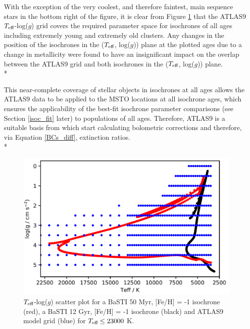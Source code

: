 \documentclass[12pt, a4paper]{report}
\begin{document}
With the exception of the very coolest, and therefore faintest, main sequence stars in the bottom right of the figure, it is clear from Figure \ref{Teff-logg coverage} that the ATLAS9 $T_{\textnormal{eff}}$-log($g$) grid covers the required parameter space for isochrones of all ages including extremely young and extremely old clusters. Any changes in the position of the isochrones in the ($T_{\textnormal{eff}}$, log($g$)) plane at the plotted ages due to a change in metallicity were found to have an insignificant impact on the overlap between the ATLAS9 grid and both isochrones in the ($T_{\textnormal{eff}}$, log($g$)) plane. \\*

This near-complete coverage of stellar objects in isochrones at all ages allows the ATLAS9 data to be applied to the MSTO locations at all isochrone ages, which ensures the applicability of the best-fit isochrone parameter comparisons (see Section \ref{isoc_fit} later) to populations of all ages. Therefore, ATLAS9 is a suitable basis from which start calculating bolometric corrections and therefore, via Equation \ref{BCs_diff}, extinction ratios. \\*

\begin{figure}[h]
\begin{center}
\includegraphics[width=1.0\textwidth]{ATLAS9_grid_BaSTI_coverage_2ages_crop.png}
\caption{$T_{\textnormal{eff}}$-log($g$) scatter plot for a BaSTI 50 Myr, [Fe/H] = -1 isochrone (red), a BaSTI 12 Gyr, [Fe/H] = -1 isochrone (black) and ATLAS9 model grid (blue) for $T_{\textnormal{eff}} \leq 23000$ K.}
\label{Teff-logg coverage}
\end{center}
\end{figure}
\end{document}
